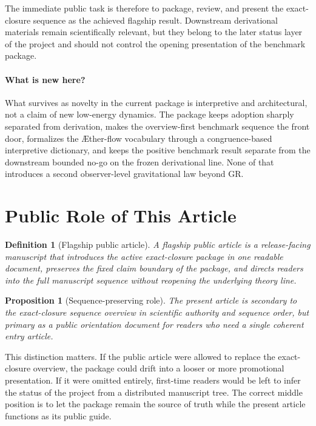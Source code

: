 \documentclass[11pt]{article}
\newcommand{\Aflow}{\AE{}ther-flow}
\newtheorem{definition}{Definition}
\newtheorem{proposition}{Proposition}
\begin{document}
The immediate public task is therefore to package, review, and present the exact-closure sequence as the achieved flagship result. Downstream derivational materials remain scientifically relevant, but they belong to the later status layer of the project and should not control the opening presentation of the benchmark package.

\paragraph{What is new here?}
What survives as novelty in the current package is interpretive and architectural, not a claim of new low-energy dynamics. The package keeps adoption sharply separated from derivation, makes the overview-first benchmark sequence the front door, formalizes the \Aflow{} vocabulary through a congruence-based interpretive dictionary, and keeps the positive benchmark result separate from the downstream bounded no-go on the frozen derivational line. None of that introduces a second observer-level gravitational law beyond GR.

\section{Public Role of This Article}

\begin{definition}[Flagship public article]
A flagship public article is a release-facing manuscript that introduces the active exact-closure package in one readable document, preserves the fixed claim boundary of the package, and directs readers into the full manuscript sequence without reopening the underlying theory line.
\end{definition}

\begin{proposition}[Sequence-preserving role]
The present article is secondary to the exact-closure sequence overview in scientific authority and sequence order, but primary as a public orientation document for readers who need a single coherent entry article.
\end{proposition}

This distinction matters. If the public article were allowed to replace the exact-closure overview, the package could drift into a looser or more promotional presentation. If it were omitted entirely, first-time readers would be left to infer the status of the project from a distributed manuscript tree. The correct middle position is to let the package remain the source of truth while the present article functions as its public guide.
\end{document}
